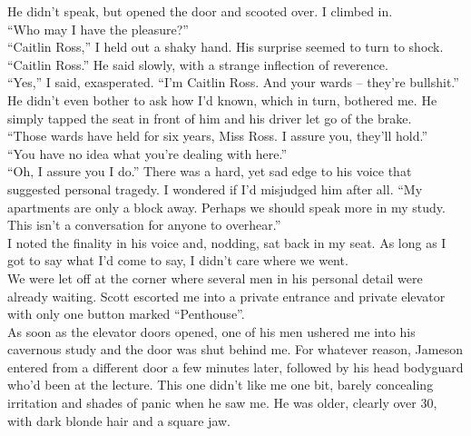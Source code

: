 \documentclass[a5paper]{scrartcl}
\begin{document}
He didn't speak, but opened the door and scooted over. I climbed in.\\


\enquote{Who may I have the pleasure?}\\


\enquote{Caitlin Ross,} I held out a shaky hand. His surprise seemed to turn to shock.\\


\enquote{Caitlin Ross.} He said slowly, with a strange inflection of reverence.\\


\enquote{Yes,} I said, exasperated. \enquote{I'm Caitlin Ross. And your wards -- they're bullshit.}\\


He didn't even bother to ask how I'd known, which in turn, bothered me. He simply tapped the seat in front of him and his driver let go of the brake.\\


\enquote{Those wards have held for six years, Miss Ross. I assure you, they'll hold.}\\


\enquote{You have no idea what you're dealing with here.}\\


\enquote{Oh, I assure you I do.} There was a hard, yet sad edge to his voice that suggested  personal tragedy. I wondered if I'd misjudged him after all. \enquote{My apartments are only a block away. Perhaps we should speak more in my study. This isn't a conversation for anyone to overhear.}\\


I noted the finality in his voice and, nodding, sat back in my seat. As long as I got to say what I'd come to say, I didn't care where we went. \\


We were let off at the corner where several men in his personal detail were already waiting. Scott escorted me into a private entrance and private elevator with only one button marked \enquote{Penthouse}.\\


As soon as the elevator doors opened, one of his men ushered me into his cavernous study and the door was shut behind me. For whatever reason, Jameson entered from a different door a few minutes later, followed by his head bodyguard who'd been at the lecture. This one didn't like me one bit, barely concealing irritation and shades of panic when he saw me. He was older, clearly over 30, with dark blonde hair and a square jaw.\\
\end{document}
